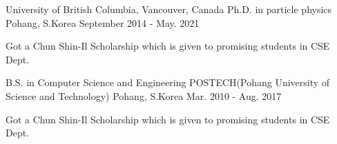 
\begin{cventries}

  \cventry
    {University of British Columbia, Vancouver, Canada} %
    {Ph.D. in particle physics} %
    {Pohang, S.Korea} %
    {September 2014 - May. 2021} %
    {
      \begin{cvitems} %
        \item {Got a Chun Shin-Il Scholarship which is given to promising students in CSE Dept.}
      \end{cvitems}
    }

  \cventry
    {B.S. in Computer Science and Engineering} %
    {POSTECH(Pohang University of Science and Technology)} %
    {Pohang, S.Korea} %
    {Mar. 2010 - Aug. 2017} %
    {
      \begin{cvitems} %
        \item {Got a Chun Shin-Il Scholarship which is given to promising students in CSE Dept.}
      \end{cvitems}
    }

\end{cventries}
